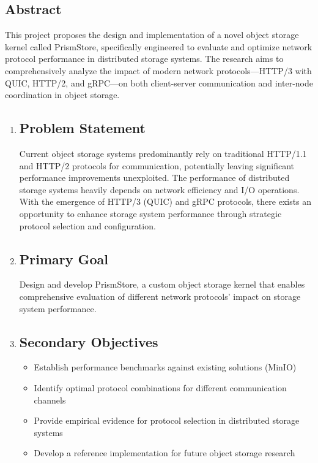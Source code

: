 \documentclass[12pt]{article}
\begin{document}
\subsection*{Abstract}
This project proposes the design and implementation of a novel object storage kernel called PrismStore, 
specifically engineered to evaluate and optimize network protocol performance in distributed storage systems. 
The research aims to comprehensively analyze the impact of modern network protocols—HTTP/3 with QUIC, HTTP/2, 
and gRPC—on both client-server communication and inter-node coordination in object storage.
\begin{enumerate}
    \item \subsection*{Problem Statement}
        Current object storage systems predominantly rely on traditional HTTP/1.1 and HTTP/2 protocols for communication, potentially leaving significant performance 
        improvements unexploited. The performance of distributed storage systems heavily depends on network efficiency and I/O operations. 
        With the emergence of HTTP/3 (QUIC) and gRPC protocols, 
        there exists an opportunity to enhance storage system performance through strategic protocol selection and configuration.
    \item \subsection*{Primary Goal}
        Design and develop PrismStore, a custom object storage kernel that enables comprehensive evaluation of different network protocols' impact on 
        storage system performance.
    \item \subsection*{Secondary Objectives}
        \begin{itemize}
            \item Establish performance benchmarks against existing solutions (MinIO)
            \item Identify optimal protocol combinations for different communication channels
            \item Provide empirical evidence for protocol selection in distributed storage systems
            \item Develop a reference implementation for future object storage research
        \end{itemize}


\end{enumerate}
\end{document}
